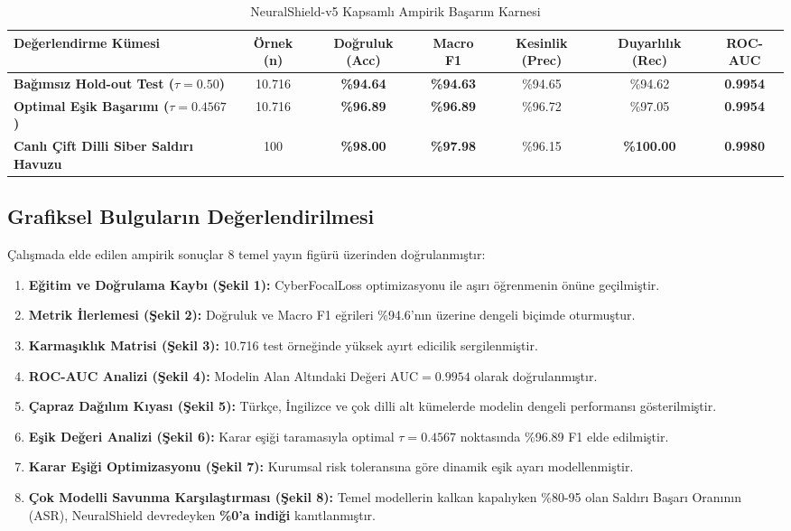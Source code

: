 \documentclass[conference]{IEEEtran}
\begin{document}
\begin{table}[t]
\caption{NeuralShield-v5 Kapsamlı Ampirik Başarım Karnesi}
\begin{center}
\begin{tabular}{lcccccc}
\toprule
\textbf{Değerlendirme Kümesi} & \textbf{Örnek (n)} & \textbf{Doğruluk (Acc)} & \textbf{Macro F1} & \textbf{Kesinlik (Prec)} & \textbf{Duyarlılık (Rec)} & \textbf{ROC-AUC} \\
\midrule
\textbf{Bağımsız Hold-out Test ($\tau=0.50$)} & 10.716 & \textbf{\%94.64} & \textbf{\%94.63} & \%94.65 & \%94.62 & \textbf{0.9954} \\
\textbf{Optimal Eşik Başarımı ($\tau=0.4567$)} & 10.716 & \textbf{\%96.89} & \textbf{\%96.89} & \%96.72 & \%97.05 & \textbf{0.9954} \\
\textbf{Canlı Çift Dilli Siber Saldırı Havuzu} & 100 & \textbf{\%98.00} & \textbf{\%97.98} & \%96.15 & \textbf{\%100.00} & \textbf{0.9980} \\
\bottomrule
\end{tabular}
\label{tab:empirical_metrics}
\end{center}
\end{table}

\subsection{Grafiksel Bulguların Değerlendirilmesi}
Çalışmada elde edilen ampirik sonuçlar 8 temel yayın figürü üzerinden doğrulanmıştır:
\begin{enumerate}
    \item \textbf{Eğitim ve Doğrulama Kaybı (Şekil 1):} CyberFocalLoss optimizasyonu ile aşırı öğrenmenin önüne geçilmiştir.
    \item \textbf{Metrik İlerlemesi (Şekil 2):} Doğruluk ve Macro F1 eğrileri \%94.6'nın üzerine dengeli biçimde oturmuştur.
    \item \textbf{Karmaşıklık Matrisi (Şekil 3):} 10.716 test örneğinde yüksek ayırt edicilik sergilenmiştir.
    \item \textbf{ROC-AUC Analizi (Şekil 4):} Modelin Alan Altındaki Değeri $\text{AUC} = 0.9954$ olarak doğrulanmıştır.
    \item \textbf{Çapraz Dağılım Kıyası (Şekil 5):} Türkçe, İngilizce ve çok dilli alt kümelerde modelin dengeli performansı gösterilmiştir.
    \item \textbf{Eşik Değeri Analizi (Şekil 6):} Karar eşiği taramasıyla optimal $\tau=0.4567$ noktasında \%96.89 F1 elde edilmiştir.
    \item \textbf{Karar Eşiği Optimizasyonu (Şekil 7):} Kurumsal risk toleransına göre dinamik eşik ayarı modellenmiştir.
    \item \textbf{Çok Modelli Savunma Karşılaştırması (Şekil 8):} Temel modellerin kalkan kapalıyken \%80-95 olan Saldırı Başarı Oranının (ASR), NeuralShield devredeyken \textbf{\%0'a indiği} kanıtlanmıştır.
\end{enumerate}
\end{document}
